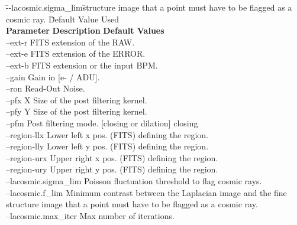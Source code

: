 \begin{tabbing}

\quad\= --lacosmic.sigma\_lim\quad  \= structure image that a point must have to be flagged as a cosmic ray. 
\quad \= Default Value Used\kill\\
\> {\bf Parameter}			\>  {\bf Description}					\> {\bf Default Values}       \\
\>  --ext-r                	\>  FITS extension of the RAW. 				      \\
\>  --ext-e               	\>  FITS extension of the ERROR. 				      \\
\>  --ext-b               	\>   FITS extension or the input BPM. 				      \\
\>  --gain                	\>  Gain in [e- / ADU]. 						      \\
\>  --ron                 	\>  Read-Out Noise. 							      \\
\>  --pfx                 	\>  X Size of the post filtering kernel. 					      \\
\>  --pfy                 	\>   Y Size of the post filtering kernel. 				      \\
\>  --pfm                 	\>   Post filtering mode. [closing or dilation] 				\> closing      \\
\>  --region-llx          	\>   Lower left x pos. (FITS) defining the region. 				      \\
\>  --region-lly          	\>   Lower left y pos. (FITS) defining the region. 				      \\
\>  --region-urx          	\>   Upper right x pos. (FITS) defining the region. 				      \\
\>  --region-ury          	\>  Upper right y pos. (FITS) defining the region. 				      \\
\>  --lacosmic.sigma\_lim  	\>   Poisson fluctuation threshold to flag cosmic rays. 				      \\
\>  --lacosmic.f\_lim     	\>   Minimum contrast between the Laplacian image and the fine   \> \\
\>                                   \> structure image that a point must have to be flagged as a cosmic ray.                  \\
\>  --lacosmic.max\_iter   	\>   Max number of iterations. 				      \\

\end{tabbing}


